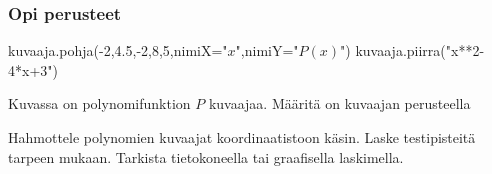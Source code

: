 \begin{tehtavasivu}

\subsubsection*{Opi perusteet}

\begin{tehtava}
\begin{kuva}
	kuvaaja.pohja(-2,4.5,-2,8,5,nimiX="$x$",nimiY="$P(x)$")
	kuvaaja.piirra("x**2-4*x+3")
\end{kuva}
Kuvassa on polynomifunktion $P$ kuvaajaa. Määritä on kuvaajan perusteella
\begin{alakohdat}
\end{alakohdat}
\begin{vastaus}
\begin{alakohdat}
\end{alakohdat}
\end{vastaus}
\end{tehtava}

\begin{tehtava}
    Hahmottele polynomien kuvaajat koordinaatistoon käsin. Laske testipisteitä tarpeen mukaan. Tarkista tietokoneella tai graafisella laskimella.
    \begin{alakohdat}
    \end{alakohdat}   
    \begin{vastaus}
    	\begin{alakohdat}
		\end{alakohdat}
    \end{vastaus}
\end{tehtava}


\end{tehtavasivu}
